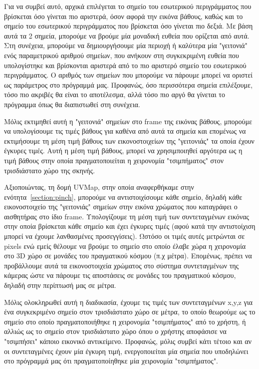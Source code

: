 Για να συμβεί αυτό, αρχικά επιλέγεται το σημείο του εσωτερικού περιγράμματος που βρίσκεται όσο γίνεται πιο αριστερά, όσον αφορά την εικόνα βάθους, καθώς και το σημείο του εσωτερικού περιγράμματος που βρίσκεται όσο γίνεται πιο δεξιά. Με βάση αυτά τα 2 σημεία, μπορούμε να βρούμε μία μοναδική ευθεία που ορίζεται από αυτά. Στη συνέχεια, μπορούμε να δημιουργήσουμε μία περιοχή ή καλύτερα μία "γειτονιά"  ενός παραμετρικού αριθμού σημείων, που ανήκουν στη συγκεκριμένη ευθεία που υπολογίστηκε και βρίσκονται αριστερά από το πιο αριστερό σημείο του εσωτερικού περιγράμματος.  Ο αριθμός των σημείων που μπορούμε να πάρουμε μπορεί να οριστεί ως παράμετρος στο πρόγραμμά μας. Προφανώς, όσο περισσότερα σημεία επιλέξουμε, τόσο πιο ακριβές θα είναι το αποτέλεσμα, αλλά τόσο πιο αργό θα γίνεται το πρόγραμμα όπως θα διαπιστωθεί στη συνέχεια. 


Μόλις εκτιμηθεί αυτή η "γειτονιά" σημείων στο frame της εικόνας βάθους, μπορούμε να υπολογίσουμε τις τιμές βάθους για καθένα από αυτά τα σημεία και επομένως να εκτιμήσουμε τη μέση τιμή βάθους των εικονοστοιχείων της "γειτονιάς" τα οποία έχουν έγκυρες τιμές. Αυτή η μέση τιμή βάθους, μπορεί να χρησιμποιηθεί αργότερα ως η τιμή βάθους στην οποία πραγματοποιείται η χειρονομία "τσιμπήματος" στον τρισδιάστατο χώρο της σκηνής. 

Αξιοποιώντας, τη δομή UVMap, στην οποία αναφερθήκαμε στην ενότητα~\ref{section:pinch}, μπορούμε να αντιστοιχίσουμε κάθε σημείο, δηλαδή κάθε εικονοστοιχείο της "γειτονιάς" σημείων στην εικόνα χρώματος που καταγράφει ο αισθητήρας στο ίδιο frame. Υπολογίζουμε τη μέση τιμή των συντεταγμένων εικόνας στην οποία βρίσκεται κάθε σημείο και έχει έγκυρες τιμές (αφού κατά την αντιστοίχιση μπορεί να έχουμε λανθασμένες προσεγγίσεις). Ωστόσο οι τιμές αυτές μετρώνται σε pixels ενώ εμείς θέλουμε να βρούμε το σημείο στο οποίο έλαβε χώρα η χειρονομία στο 3D χώρο σε μονάδες του πραγματικού κόσμου (π.χ μέτρα). Επομένως, πρέπει να προβάλλουμε αυτά τα εικονοστοιχεία χρώματος στο σύστημα συντεταγμένων της κάμερας ώστε να πάρουμε τις αποστάσεις σε μονάδες του πραγματικού κόσμου, δηλαδή στην περίπτωσή μας σε μέτρα. 


Μόλις ολοκληρωθεί αυτή η διαδικασία, έχουμε τις τιμές των συντεταγμένων x,y,z για ένα συγκεκριμένο σημείο στον τρισδιάστατο χώρο σε μέτρα, το οποίο θεωρούμε ως το σημείο στο οποίο πραγματοποιήθηκε η χειρονομία "τσιμπήματος" από το χρήστη, ή αλλιώς ως το σημείο στον τρισδιάστατο χώρο όπου ο χρήστης αποφάσισε να "τσιμπήσει" κάποιο εικονικό αντικείμενο. Προφανώς, μόλις συμβεί κάτι τέτοιο και αν οι συντεταγμένες έχουν μία έγκυρη τιμή, ενεργοποιείται μία σημεία που υποδηλώνει στο πρόγραμμά μας ότι πραγματοποίηθηκε μία χειρονομία "τσιμπήματος". 

